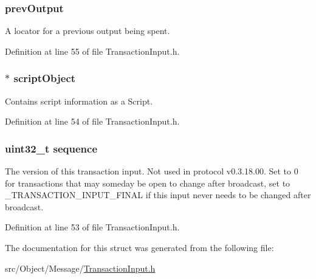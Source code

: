 \hypertarget{struct_transaction_input_a20cfe78368fb9825302ce5cdb076f8b1}{
\subsubsection[{prevOutput}]{ {\bf prevOutput}}}
\label{struct_transaction_input_a20cfe78368fb9825302ce5cdb076f8b1}
A locator for a previous output being spent. 

Definition at line 55 of file TransactionInput.h.

\hypertarget{struct_transaction_input_ac420de2766b1358b5e325cfc21a76aa3}{
\subsubsection[{scriptObject}]{$\ast$ {\bf scriptObject}}}
\label{struct_transaction_input_ac420de2766b1358b5e325cfc21a76aa3}
Contains script information as a Script. 

Definition at line 54 of file TransactionInput.h.

\hypertarget{struct_transaction_input_a0ab03ef2cc38198d3666a992a245fddf}{
\subsubsection[{sequence}]{\setlength{\rightskip}{0pt plus 5cm}uint32\_\-t {\bf sequence}}}
\label{struct_transaction_input_a0ab03ef2cc38198d3666a992a245fddf}
The version of this transaction input. Not used in protocol v0.3.18.00. Set to 0 for transactions that may someday be open to change after broadcast, set to \_\-TRANSACTION\_\-INPUT\_\-FINAL if this input never needs to be changed after broadcast. 

Definition at line 53 of file TransactionInput.h.



The documentation for this struct was generated from the following file:\begin{DoxyCompactItemize}
\item 
src/Object/Message/\hyperlink{_transaction_input_8h}{TransactionInput.h}\end{DoxyCompactItemize}
